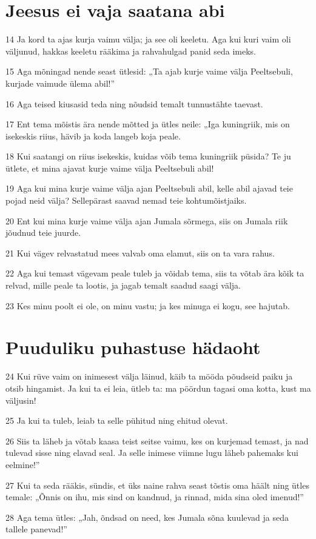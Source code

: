 \section*{Jeesus ei vaja saatana abi}

\par 14 Ja kord ta ajas kurja vaimu välja; ja see oli keeletu. Aga kui kuri vaim oli väljunud, hakkas keeletu rääkima ja rahvahulgad panid seda imeks.
\par 15 Aga mõningad nende seast ütlesid: „Ta ajab kurje vaime välja Peeltsebuli, kurjade vaimude ülema abil!”
\par 16 Aga teised kiusasid teda ning nõudsid temalt tunnustähte taevast.
\par 17 Ent tema mõistis ära nende mõtted ja ütles neile: „Iga kuningriik, mis on isekeskis riius, hävib ja koda langeb koja peale.
\par 18 Kui saatangi on riius isekeskis, kuidas võib tema kuningriik püsida? Te ju ütlete, et mina ajavat kurje vaime välja Peeltsebuli abil!
\par 19 Aga kui mina kurje vaime välja ajan Peeltsebuli abil, kelle abil ajavad teie pojad neid välja? Sellepärast saavad nemad teie kohtumõistjaiks.
\par 20 Ent kui mina kurje vaime välja ajan Jumala sõrmega, siis on Jumala riik jõudnud teie juurde.
\par 21 Kui vägev relvastatud mees valvab oma elamut, siis on ta vara rahus.
\par 22 Aga kui temast vägevam peale tuleb ja võidab tema, siis ta võtab ära kõik ta relvad, mille peale ta lootis, ja jagab temalt saadud saagi välja.
\par 23 Kes minu poolt ei ole, on minu vastu; ja kes minuga ei kogu, see hajutab.

\section*{Puuduliku puhastuse hädaoht}

\par 24 Kui rüve vaim on inimesest välja läinud, käib ta mööda põudseid paiku ja otsib hingamist. Ja kui ta ei leia, ütleb ta: ma pöördun tagasi oma kotta, kust ma väljusin!
\par 25 Ja kui ta tuleb, leiab ta selle pühitud ning ehitud olevat.
\par 26 Siis ta läheb ja võtab kaasa teist seitse vaimu, kes on kurjemad temast, ja nad tulevad sisse ning elavad seal. Ja selle inimese viimne lugu läheb pahemaks kui eelmine!”
\par 27 Kui ta seda rääkis, sündis, et üks naine rahva seast tõstis oma häält ning ütles temale: „Õnnis on ihu, mis sind on kandnud, ja rinnad, mida sina oled imenud!”
\par 28 Aga tema ütles: „Jah, õndsad on need, kes Jumala sõna kuulevad ja seda tallele panevad!”

